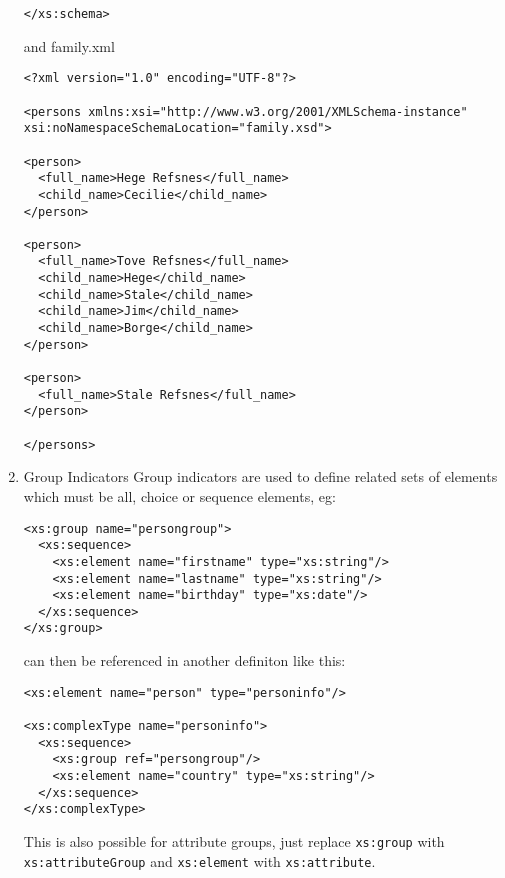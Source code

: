 \documentclass[11pt]{article}
\begin{document}
\begin{enumerate}
\begin{lstlisting}
</xs:schema>
\end{lstlisting}
and family.xml
\lstset{breaklines=true,language=XML,label= ,caption= ,captionpos=b,numbers=none}
\begin{lstlisting}
<?xml version="1.0" encoding="UTF-8"?>

<persons xmlns:xsi="http://www.w3.org/2001/XMLSchema-instance"
xsi:noNamespaceSchemaLocation="family.xsd">

<person>
  <full_name>Hege Refsnes</full_name>
  <child_name>Cecilie</child_name>
</person>

<person>
  <full_name>Tove Refsnes</full_name>
  <child_name>Hege</child_name>
  <child_name>Stale</child_name>
  <child_name>Jim</child_name>
  <child_name>Borge</child_name>
</person>

<person>
  <full_name>Stale Refsnes</full_name>
</person>

</persons>
\end{lstlisting}


\item Group Indicators
\label{sec:org172fc57}
Group indicators are used to define related sets of elements which must be all, choice or sequence elements, eg:
\lstset{breaklines=true,language=XML,label= ,caption= ,captionpos=b,numbers=none}
\begin{lstlisting}
<xs:group name="persongroup">
  <xs:sequence>
    <xs:element name="firstname" type="xs:string"/>
    <xs:element name="lastname" type="xs:string"/>
    <xs:element name="birthday" type="xs:date"/>
  </xs:sequence>
</xs:group>
\end{lstlisting}
can then be referenced in another definiton like this:
\lstset{breaklines=true,language=XML,label= ,caption= ,captionpos=b,numbers=none}
\begin{lstlisting}
<xs:element name="person" type="personinfo"/>

<xs:complexType name="personinfo">
  <xs:sequence>
    <xs:group ref="persongroup"/>
    <xs:element name="country" type="xs:string"/>
  </xs:sequence>
</xs:complexType>
\end{lstlisting}
This is also possible for attribute groups, just replace \texttt{xs:group} with \texttt{xs:attributeGroup} and \texttt{xs:element} with \texttt{xs:attribute}.
\end{enumerate}
\end{document}

